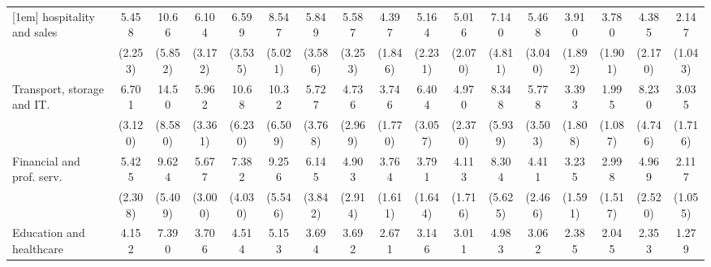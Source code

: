 {\begin{tabular}{l*{16}{c}}
[1em]
hospitality and sales&       5.458\sym{***}&       10.66\sym{***}&       6.104\sym{***}&       6.599\sym{***}&       8.547\sym{***}&       5.849\sym{**} &       5.587\sym{**} &       4.397\sym{***}&       5.164\sym{***}&       5.016\sym{***}&       7.140\sym{**} &       5.468\sym{**} &       3.910\sym{**} &       3.780\sym{**} &       4.385\sym{**} &       2.147         \\
                    &     (2.253)         &     (5.852)         &     (3.172)         &     (3.535)         &     (5.021)         &     (3.586)         &     (3.253)         &     (1.846)         &     (2.231)         &     (2.070)         &     (4.811)         &     (3.040)         &     (1.892)         &     (1.901)         &     (2.170)         &     (1.043)         \\
[1em]
Transport, storage and IT.&       6.701\sym{***}&       14.50\sym{***}&       5.962\sym{**} &       10.68\sym{***}&       10.32\sym{***}&       5.727\sym{**} &       4.736\sym{*}  &       3.746\sym{**} &       6.404\sym{***}&       4.970\sym{***}&       8.348\sym{**} &       5.778\sym{**} &       3.393\sym{*}  &       1.995         &       8.230\sym{***}&       3.035\sym{*}  \\
                    &     (3.120)         &     (8.580)         &     (3.361)         &     (6.230)         &     (6.509)         &     (3.768)         &     (2.969)         &     (1.770)         &     (3.057)         &     (2.370)         &     (5.939)         &     (3.503)         &     (1.808)         &     (1.087)         &     (4.746)         &     (1.716)         \\
[1em]
Financial and prof. serv.&       5.425\sym{***}&       9.624\sym{***}&       5.677\sym{**} &       7.382\sym{***}&       9.256\sym{***}&       6.145\sym{**} &       4.903\sym{**} &       3.764\sym{**} &       3.791\sym{**} &       4.113\sym{***}&       8.304\sym{**} &       4.411\sym{**} &       3.235\sym{*}  &       2.998\sym{*}  &       4.969\sym{**} &       2.117         \\
                    &     (2.308)         &     (5.409)         &     (3.000)         &     (4.030)         &     (5.546)         &     (3.842)         &     (2.914)         &     (1.611)         &     (1.644)         &     (1.716)         &     (5.625)         &     (2.466)         &     (1.591)         &     (1.517)         &     (2.520)         &     (1.055)         \\
[1em]
Education and healthcare&       4.152\sym{***}&       7.390\sym{***}&       3.706\sym{*}  &       4.514\sym{**} &       5.153\sym{**} &       3.694\sym{*}  &       3.692\sym{*}  &       2.671\sym{*}  &       3.146\sym{**} &       3.011\sym{**} &       4.983\sym{*}  &       3.062\sym{*}  &       2.385         &       2.045         &       2.353         &       1.279         \\

\end{tabular}}
